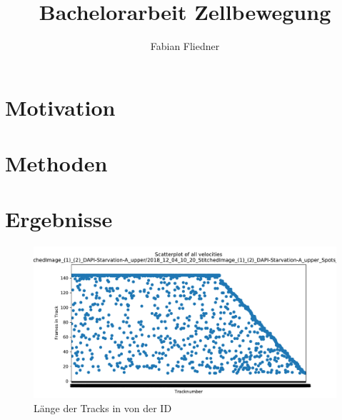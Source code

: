 \documentclass[]{article}
\title{Bachelorarbeit Zellbewegung}
\author{Fabian Fliedner}
\begin{document}
\maketitle

\begin{abstract}

\end{abstract}

\section{Motivation}
\section{Methoden}
\section{Ergebnisse}
\begin{figure}
	\centering
	\includegraphics[width=0.7\linewidth]{BildDateien/length_of_all_tracks}
	\caption[Tracklänge nach ID]{Länge der Tracks in von der ID}
	\label{fig:lengthofalltracks}
\end{figure}
\end{document}
